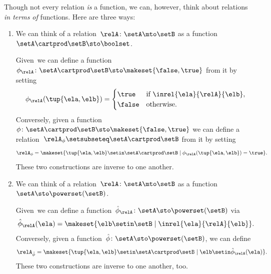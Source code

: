 \label{rem:rel-three-fun-descriptions}
Though not every relation \emph{is} a function, we can, however, think about relations \emph{in terms of} functions.
Here are three ways:
\begin{enumerate}
    \item We can think of a relation~$\relA \colon \setA \mto\setB$ as a function~$\setA \cartprod \setB \sto \boolset$.

          Given~\relA we can define a function~$\phi_{\relA} \colon \setA \cartprod \setB \sto \makeset{ \false, \true }$ from it by setting
          \begin{equation}
              \phi_{\relA}(\tup{\ela, \elb}) =
              \begin{cases}
                  \true  & \text{if } \inrel{\ela}{\relA}{\elb}, \\
                  \false & \text{otherwise}.
              \end{cases}
          \end{equation}
          Conversely, given a function~$\phi\colon \setA \cartprod \setB \sto \makeset{ \false, \true }$ we can define a relation~$\relA_{\phi} \setsubseteq \setA \cartprod \setB$ from it by setting
          \begin{equation}
              \relA_{\phi} = \makeset{ \tup{\ela, \elb} \setin \setA \cartprod \setB \mid \phi_{\relA}(\tup{\ela, \elb}) = \true }.
          \end{equation}
          These two constructions are inverse to one another.

    \item We can think of a relation~$\relA \colon \setA \mto \setB$ as a function~$\setA  \sto \powerset (\setB)$.

          Given~\relA we can define a function~$\hat \phi_{\relA} \colon \setA \sto \powerset (\setB)$ via
          \begin{equation}
              \hat \phi_{\relA} (\ela) = \makeset{ \elb \setin \setB \mid \inrel{\ela}{\relA}{\elb}}.
          \end{equation}
          Conversely, given a function~$\hat \phi \colon \setA \sto \powerset (\setB)$, we can define
          \begin{equation}
              \relA_{\hat \phi} = \makeset{ \tup{\ela, \elb} \setin \setA \cartprod \setB \mid \elb \setin \hat \phi_{\relA}(\ela) }.
          \end{equation}
          These two constructions are inverse to one another, too.


\end{enumerate}
